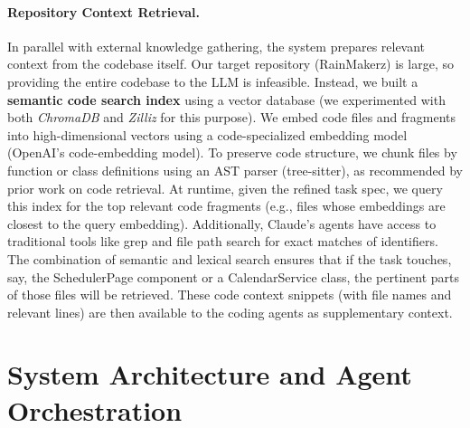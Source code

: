 \documentclass[11pt]{article}
\begin{document}
\paragraph{Repository Context Retrieval.} In parallel with external knowledge gathering, the system prepares relevant context from the codebase itself. Our target repository (RainMakerz) is large, so providing the entire codebase to the LLM is infeasible. Instead, we built a \textbf{semantic code search index} using a vector database (we experimented with both \emph{ChromaDB} and \emph{Zilliz} for this purpose). We embed code files and fragments into high-dimensional vectors using a code-specialized embedding model (OpenAI's code-embedding model). To preserve code structure, we chunk files by function or class definitions using an AST parser (tree-sitter), as recommended by prior work on code retrieval. At runtime, given the refined task spec, we query this index for the top relevant code fragments (e.g., files whose embeddings are closest to the query embedding). Additionally, Claude's agents have access to traditional tools like grep and file path search for exact matches of identifiers. The combination of semantic and lexical search ensures that if the task touches, say, the SchedulerPage component or a CalendarService class, the pertinent parts of those files will be retrieved. These code context snippets (with file names and relevant lines) are then available to the coding agents as supplementary context.

\section{System Architecture and Agent Orchestration}
\label{sec:architecture}
\end{document}
